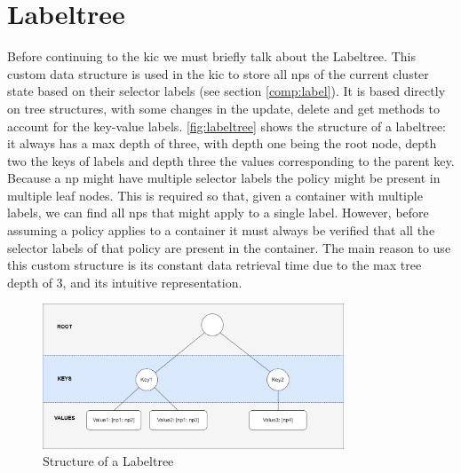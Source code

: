 

\section{Labeltree} \label{impl:labeltree}
Before continuing to the \acrlong{kic} we must briefly talk about the Labeltree. This custom data structure is used in the \acrshort{kic} to store all \acrshort{np}s of the current cluster state based on their selector labels (see section \ref{comp:label}). It is based directly on tree structures, with some changes in the update, delete and get methods to account for the key-value labels. \autoref{fig:labeltree} shows the structure of a labeltree: it always has a max depth of three, with depth one being the root node, depth two the keys of labels and depth three the values corresponding to the parent key. 
\\[10pt]

Because a \acrshort{np} might have multiple selector labels the policy might be present in multiple leaf nodes. This is required so that, given a container with multiple labels, we can find all \acrshort{np}s that might apply to a single label. However, before assuming a policy applies to a container it must always be verified that all the selector labels of that policy are present in the container. The main reason to use this custom structure is its constant data retrieval time due to the max tree depth of 3, and its intuitive representation. 
\begin{figure}[htbp]
  \centering
  \includegraphics[width=0.8\textwidth]{images/labeltree.png}
  \caption{Structure of a Labeltree}
  \label{fig:labeltree}
\end{figure}

\newpage
